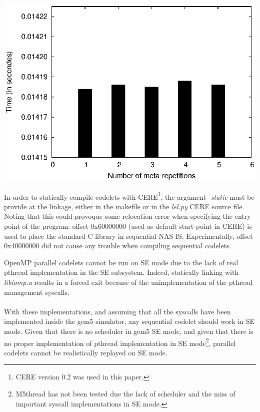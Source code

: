 \documentclass{article}
\newenvironment{Figure}
  {\par\medskip\noindent\minipage{\linewidth}}
  {\endminipage\par\bigskip\medskip}
\begin{document}
\begin{multicols}{2}
\begin{Figure}
\centering
\includegraphics[width=\linewidth]{vari_se.eps}
\end{Figure}


In order to statically compile codelets with CERE\footnote{CERE version 0.2 was used in this paper.}, the argument \textit{-static} must be provide at the linkage, either in the makefile or in the \textit{lel.py} CERE source file. Noting that this could provoque some relocation error when specifying the entry point of the program: offset 0x60000000 (used as default start point in CERE) is used to place the standard C library in sequential NAS IS. Experimentally, offset 0x40000000 did not cause any trouble when compiling sequential codelets. 


OpenMP parallel codelets cannot be run on SE mode due to the lack of real pthread implementation in the SE subsystem. Indeed, statically linking with \textit{libiomp.a} results in a forced exit because of the unimplementation of the pthread management syscalls.

\paragraph{}
With these implementations, and assuming that all the syscalls have been implemented inside the gem5 simulator, any sequential codelet should work in SE mode. Given that there is no scheduler in gem5 SE mode, and given that there is no proper implementation of pthread implementation in SE mode\footnote{M5thread has not been tested due the lack of scheduler and the miss of important syscall implementations in SE mode.}, parallel codelets cannot be realistically replayed on SE mode.


\end{multicols}
\end{document}
